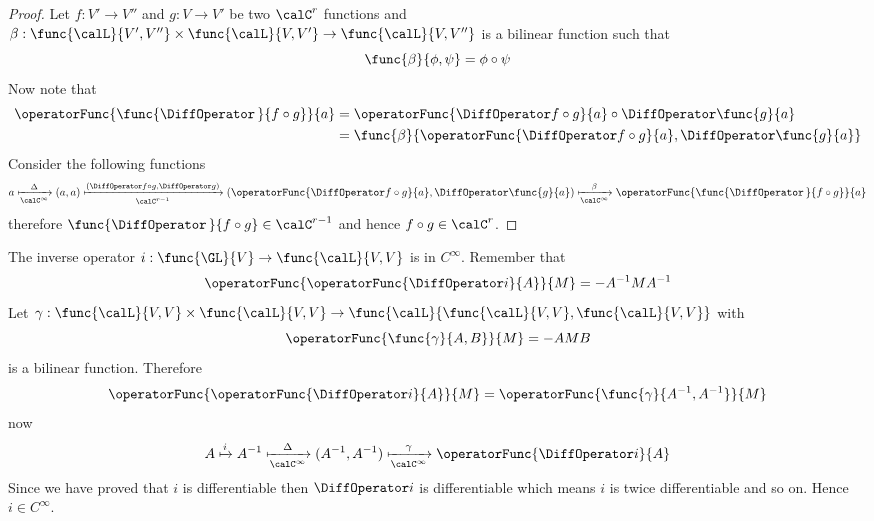 \begin{proof}
    Let \(f: V' \to V''\) and \(g: V \to V'\) be two \(\calC^r\) functions and  \(\beta : \func{\calL}{V',V''} \times \func{\calL}{V,V'} \to \func{\calL}{V,V''}\) is a bilinear function such that
    \begin{equation*}
        \func{\beta}{\phi,\psi} = \phi \circ \psi
    \end{equation*}
    Now note that
    \begin{align*}
        \operatorFunc{\func{\DiffOperator \,}{ f \circ g}}{a} & = \operatorFunc{\DiffOperator f \circ g}{a}\circ \DiffOperator \func{g}{a}            \\
                                                              & = \func{\beta }{\operatorFunc{\DiffOperator f \circ g}{a}, \DiffOperator \func{g}{a}}
    \end{align*}
    Consider the following functions
    \begin{equation*}
        a \xmapsto[\calC^\infty]{\Delta} (a,a) \xmapsto[\calC^{r-1}]{(\DiffOperator f \circ g, \DiffOperator g)} (\operatorFunc{\DiffOperator f \circ g}{a}, \DiffOperator \func{g}{a}) \xmapsto[\calC^\infty]{\beta}  \operatorFunc{\func{\DiffOperator \,}{ f \circ g}}{a}
    \end{equation*}
    therefore \(\func{\DiffOperator \,}{ f \circ g} \in \calC^{r-1}\) and hence \(f \circ g \in \calC^{r}\).
\end{proof}

\begin{example}
    The inverse operator \(i : \func{\GL}{V} \to \func{\calL}{V,V}\) is in \(C^\infty\). Remember that
    \begin{equation*}
        \operatorFunc{\operatorFunc{\DiffOperator i}{A}}{M} = - A^{-1}M A^{-1}
    \end{equation*}
    Let \(\gamma : \func{\calL}{V,V} \times \func{\calL}{V,V} \to \func{\calL}{\func{\calL}{V,V} , \func{\calL}{V,V}}\) with
    \begin{equation*}
        \operatorFunc{\func{\gamma}{A,B}}{M} = - AMB
    \end{equation*}
    is a bilinear function. Therefore
    \begin{equation*}
        \operatorFunc{\operatorFunc{\DiffOperator i}{A}}{M} = \operatorFunc{\func{\gamma}{A^{-1},A^{-1}}}{M}
    \end{equation*}
    now
    \begin{equation*}
        A \xmapsto{i} A^{-1} \xmapsto[\calC^\infty]{\Delta} (A^{-1}, A^{-1}) \xmapsto[\calC^\infty]{\gamma} \operatorFunc{\DiffOperator i}{A}
    \end{equation*}
    Since we have proved that \(i\) is differentiable then \(\DiffOperator i\) is differentiable which means \(i\) is twice differentiable and so on. Hence \(i \in C^{\infty}\).
\end{example}

